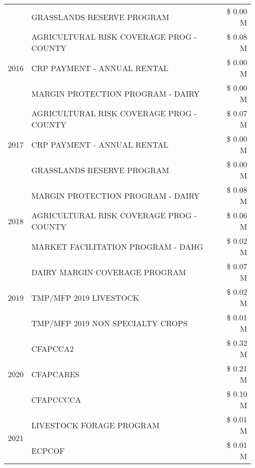\begin{tabular}{llr}
 & GRASSLANDS RESERVE PROGRAM & \$ 0.00 M \\
\cline{1-3}
\multirow[t]{3}{*}{2016} & AGRICULTURAL RISK COVERAGE PROG - COUNTY & \$ 0.08 M \\
 & CRP PAYMENT - ANNUAL RENTAL & \$ 0.00 M \\
 & MARGIN PROTECTION PROGRAM - DAIRY & \$ 0.00 M \\
\cline{1-3}
\multirow[t]{3}{*}{2017} & AGRICULTURAL RISK COVERAGE PROG - COUNTY & \$ 0.07 M \\
 & CRP PAYMENT - ANNUAL RENTAL & \$ 0.00 M \\
 & GRASSLANDS RESERVE PROGRAM & \$ 0.00 M \\
\cline{1-3}
\multirow[t]{3}{*}{2018} & MARGIN PROTECTION PROGRAM - DAIRY & \$ 0.08 M \\
 & AGRICULTURAL RISK COVERAGE PROG - COUNTY & \$ 0.06 M \\
 & MARKET FACILITATION PROGRAM - DAHG & \$ 0.02 M \\
\cline{1-3}
\multirow[t]{3}{*}{2019} & DAIRY MARGIN COVERAGE PROGRAM & \$ 0.07 M \\
 & TMP/MFP 2019 LIVESTOCK & \$ 0.02 M \\
 & TMP/MFP 2019 NON SPECIALTY CROPS & \$ 0.01 M \\
\cline{1-3}
\multirow[t]{3}{*}{2020} & CFAPCCA2 & \$ 0.32 M \\
 & CFAPCARES & \$ 0.21 M \\
 & CFAPCCCCA & \$ 0.10 M \\
\cline{1-3}
\multirow[t]{2}{*}{2021} & LIVESTOCK FORAGE PROGRAM & \$ 0.01 M \\
 & ECPCOF & \$ 0.01 M \\
\cline{1-3}
\bottomrule
\end{tabular}
